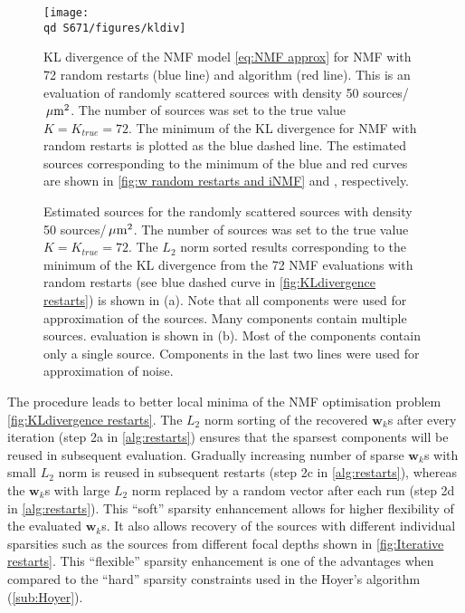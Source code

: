 \begin{figure}[!tb]
	\newcommand{\widthfig}{.5\textwidth}
	\centering
	\texttt{[image: \\qd S671/figures/kldiv]}
	\caption{KL divergence of the NMF model \autoref{eq:NMF approx} for NMF with 72 random restarts (blue line) and \inmf{} algorithm (red line). This is an evaluation of randomly scattered sources with density 50 sources/$\, \mathrm{\mu m}^2$. The number of sources was set to the true value $K=K_{true}=72$. The minimum of the KL divergence for NMF with random restarts is plotted as the blue dashed line. The estimated sources corresponding to the minimum of the blue and red curves are shown in \autoref{fig:w random restarts and iNMF}\aaa{} and \bbb{}, respectively.}
	\label{fig:KLdivergence restarts}
\end{figure}

\begin{figure}[!tb]
	\newcommand{\wf}{.45\textwidth}
	\centering
	\hspace{1cm}
	\caption{Estimated sources for the randomly scattered sources with density 50 sources/$\, \mathrm{\mu m}^2$. The number of sources was set to the true value $K=K_{true}=72$. The $L_2$ norm sorted results corresponding to the minimum of the KL divergence from the 72 NMF evaluations with random restarts (see blue dashed curve in \autoref{fig:KLdivergence restarts}) is shown in (a). Note that all components were used for approximation of the sources. Many components contain multiple sources. \inmf{} evaluation is shown in (b). Most of the components contain only a single source. Components in the last two lines were used for approximation of noise.}
	\label{fig:w random restarts and iNMF}	
\end{figure}



The \inmf{} procedure leads to better local minima of the NMF optimisation problem \autoref{fig:KLdivergence restarts}. The $L_2$ norm sorting of the recovered $\bm{w}_k$s after every iteration (step 2a in \autoref{alg:restarts}) ensures that the sparsest components will be reused in subsequent evaluation. Gradually increasing number of sparse $\bm{w}_k$s with small $L_2$ norm is reused in subsequent restarts (step 2c in \autoref{alg:restarts}), whereas the $\bm{w}_k$s with large $L_2$ norm replaced by a random vector after each run (step 2d in \autoref{alg:restarts}). This ``soft'' sparsity enhancement allows for higher flexibility of the evaluated $\bm{w}_k$s. It also allows recovery of the sources with different individual sparsities such as the sources from different focal depths shown in \autoref{fig:Iterative restarts}\ddd. This ``flexible'' sparsity enhancement is one of the \inmf{} advantages when compared to the ``hard'' sparsity constraints used in the Hoyer's algorithm (\autoref{sub:Hoyer}).

